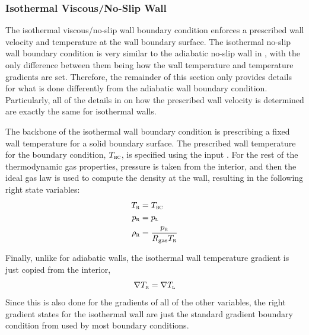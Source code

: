 \subsubsection{Isothermal Viscous\slash No-Slip Wall}
\label{SEC:BC:Wall:Isothermal}

The isothermal viscous\slash no-slip wall boundary condition enforces a
prescribed wall velocity and temperature at the wall boundary surface.
%
The isothermal no-slip wall boundary condition is very similar to the adiabatic
no-slip wall in , with the only difference between
them being how the wall temperature and temperature gradients are set.
%
Therefore, the remainder of this section only provides details for what is done
differently from the adiabatic wall boundary condition.
%
Particularly, all of the details in  on how the
prescribed wall velocity is determined are exactly the same for isothermal
walls.


The backbone of the isothermal wall boundary condition is prescribing a fixed
wall temperature for a solid boundary surface.
%
The prescribed wall temperature for the boundary condition, $T_{\textsc{bc}}$, is
specified using the input
.
%
For the rest of the thermodynamic gas properties, pressure is taken from the
interior, and then the ideal gas law is used to compute the density at the wall,
resulting in the following right state variables:
%
\begin{alignat*}{1}
  T_{\textsc{r}} & = T_{\textsc{bc}} \\
  p_{\textsc{r}} & = p_{\textsc{l}} \\
  \rho_{\textsc{r}} & = \frac{p_{\textsc{r}}}{R_{\textrm{gas}} T_{\textsc{r}}}
\end{alignat*}


Finally, unlike for adiabatic walls, the isothermal wall temperature gradient is
just copied from the interior,
%
\begin{equation*}
  \nabla T_{\textsc{r}} = \nabla T_{\textsc{l}}
\end{equation*}
%
Since this is also done for the gradients of all of the other variables, the
right gradient states for the isothermal wall are just the standard
 gradient boundary condition from
 used by most boundary conditions.



